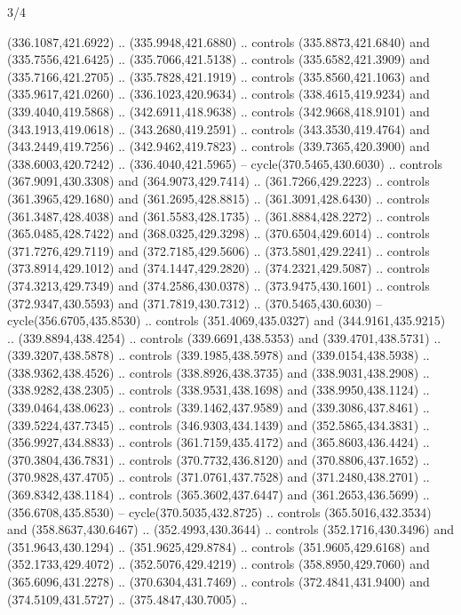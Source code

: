\begin{flagdescription}{3/4}
\begin{scope}[xshift=0.5\flaglength]
\begin{scope}[scale=0.002\flagwidth,yshift=146.5mm,xshift=-52mm]
\begin{scope}[y=0.80pt, x=0.80pt, yscale=-1, xscale=1, inner sep=0pt, outer sep=0pt]
\begin{scope}[cm={{1.03426,0.0,0.0,1.03426,(-229.44745,-87.97837)}}]
\begin{scope}[fill=black]
  (336.1087,421.6922) .. (335.9948,421.6880) .. controls (335.8873,421.6840) and
  (335.7556,421.6425) .. (335.7066,421.5138) .. controls (335.6582,421.3909) and
  (335.7166,421.2705) .. (335.7828,421.1919) .. controls (335.8560,421.1063) and
  (335.9617,421.0260) .. (336.1023,420.9634) .. controls (338.4615,419.9234) and
  (339.4040,419.5868) .. (342.6911,418.9638) .. controls (342.9668,418.9101) and
  (343.1913,419.0618) .. (343.2680,419.2591) .. controls (343.3530,419.4764) and
  (343.2449,419.7256) .. (342.9462,419.7823) .. controls (339.7365,420.3900) and
  (338.6003,420.7242) .. (336.4040,421.5965) -- cycle(370.5465,430.6030) ..
  controls (367.9091,430.3308) and (364.9073,429.7414) .. (361.7266,429.2223) ..
  controls (361.3965,429.1680) and (361.2695,428.8815) .. (361.3091,428.6430) ..
  controls (361.3487,428.4038) and (361.5583,428.1735) .. (361.8884,428.2272) ..
  controls (365.0485,428.7422) and (368.0325,429.3298) .. (370.6504,429.6014) ..
  controls (371.7276,429.7119) and (372.7185,429.5606) .. (373.5801,429.2241) ..
  controls (373.8914,429.1012) and (374.1447,429.2820) .. (374.2321,429.5087) ..
  controls (374.3213,429.7349) and (374.2586,430.0378) .. (373.9475,430.1601) ..
  controls (372.9347,430.5593) and (371.7819,430.7312) .. (370.5465,430.6030) --
  cycle(356.6705,435.8530) .. controls (351.4069,435.0327) and
  (344.9161,435.9215) .. (339.8894,438.4254) .. controls (339.6691,438.5353) and
  (339.4701,438.5731) .. (339.3207,438.5878) .. controls (339.1985,438.5978) and
  (339.0154,438.5938) .. (338.9362,438.4526) .. controls (338.8926,438.3735) and
  (338.9031,438.2908) .. (338.9282,438.2305) .. controls (338.9531,438.1698) and
  (338.9950,438.1124) .. (339.0464,438.0623) .. controls (339.1462,437.9589) and
  (339.3086,437.8461) .. (339.5224,437.7345) .. controls (346.9303,434.1439) and
  (352.5865,434.3831) .. (356.9927,434.8833) .. controls (361.7159,435.4172) and
  (365.8603,436.4424) .. (370.3804,436.7831) .. controls (370.7732,436.8120) and
  (370.8806,437.1652) .. (370.9828,437.4705) .. controls (371.0761,437.7528) and
  (371.2480,438.2701) .. (369.8342,438.1184) .. controls (365.3602,437.6447) and
  (361.2653,436.5699) .. (356.6708,435.8530) -- cycle(370.5035,432.8725) ..
  controls (365.5016,432.3534) and (358.8637,430.6467) .. (352.4993,430.3644) ..
  controls (352.1716,430.3496) and (351.9643,430.1294) .. (351.9625,429.8784) ..
  controls (351.9605,429.6168) and (352.1733,429.4072) .. (352.5076,429.4219) ..
  controls (358.8950,429.7060) and (365.6096,431.2278) .. (370.6304,431.7469) ..
  controls (372.4841,431.9400) and (374.5109,431.5727) .. (375.4847,430.7005) ..

\end{scope}
\end{scope}
\end{scope}
\end{scope}
\end{scope}
\end{flagdescription}
